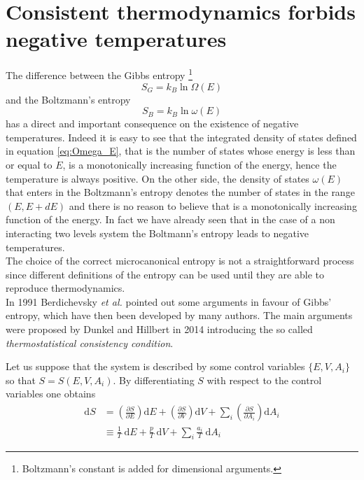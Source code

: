 \section{Consistent thermodynamics forbids negative temperatures}
The difference between the Gibbs entropy \footnote{Boltzmann's constant is added for dimensional arguments.}
\begin{equation}
    S_G = k_B \ln \Omega(E)
    \label{eq:gibbs_entropy_formula}
\end{equation}  
and the Boltzmann's entropy 
\begin{equation}
    S_B = k_B \ln \omega(E)
    \label{eq:Boltzmann_entropy_formula}
\end{equation}
has a direct and important consequence on the existence of negative temperatures. Indeed it is easy to see that the integrated density of states defined in equation 
\ref{eq:Omega_E}, that is the number of states whose energy is less than or equal to $E$, is a monotonically increasing function of the energy, hence the temperature is always positive. On the other side,
the density of states $\omega(E)$ that enters in the Boltzmann's entropy denotes the number of states in the range $(E, E+dE)$ and there is no reason to believe that is a monotonically increasing function of the energy. In fact we have already seen
that in the case of a non interacting two levels system the Boltmann's entropy leads to negative temperatures. \\
The choice of the correct microcanonical entropy is not a straightforward process since different definitions of the entropy can be used until they are able to reproduce thermodynamics. \\
In 1991 Berdichevsky \textit{et al.} \cite{original_entropy} pointed out some arguments in favour of Gibbs' entropy, which have then been developed by many authors. The main arguments were proposed by 
Dunkel and Hillbert in 2014 \cite{Dunkel_Hillbert} introducing the so called \emph{thermostatistical consistency condition}. \par 
\vspace{10pt} 
Let us suppose that the system is described by some control variables $\{E, V, A_i\}$ so that $S = S(E, V, A_i)$. By differentiating $S$ with respect to the control variables one obtains
\begin{equation*}
    \begin{aligned}
        \mathrm{d} S &=\left(\frac{\partial S}{\partial E}\right) \mathrm{d} E+\left(\frac{\partial S}{\partial V}\right) \mathrm{d} V+\sum_{i}\left(\frac{\partial S}{\partial A_{i}}\right) \mathrm{d} A_{i} \\
        & \equiv \frac{1}{T} \mathrm{~d} E+\frac{p}{T} \mathrm{~d} V+\sum_{i} \frac{a_{i}}{T} \mathrm{~d} A_{i}
        \end{aligned}
\end{equation*}
